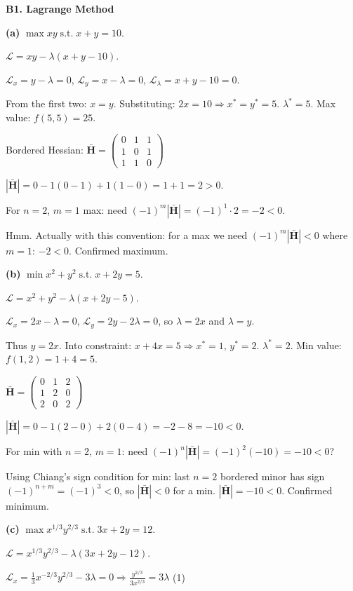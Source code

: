 \documentclass[12pt, a4paper]{article}
\theoremstyle{definition}
\newcommand{\bH}{\mathbf{H}}
\newcommand{\st}{\;\text{s.t.}\;}
\begin{document}
\begin{solbox}
\textbf{B1. Lagrange Method}

\textbf{(a)} $\max xy \st x+y=10$.

$\mathcal{L} = xy - \lambda(x+y-10)$.

$\mathcal{L}_x = y-\lambda=0$, $\mathcal{L}_y = x-\lambda=0$, $\mathcal{L}_\lambda = x+y-10=0$.

From the first two: $x=y$. Substituting: $2x=10 \Rightarrow x^*=y^*=5$.
$\lambda^*=5$. Max value: $f(5,5)=25$.

Bordered Hessian:
$\bar{\bH}=\begin{pmatrix}0&1&1\\1&0&1\\1&1&0\end{pmatrix}$

$|\bar{\bH}| = 0-1(0-1)+1(1-0)=1+1=2>0$.

For $n=2$, $m=1$ max: need $(-1)^m|\bar{\bH}|=(-1)^1\cdot 2=-2<0$.

Hmm. Actually with this convention: for a max we need $(-1)^m|\bar{\bH}|<0$
where $m=1$: $-2<0$. \checkmark Confirmed maximum.

\medskip
\textbf{(b)} $\min x^2+y^2 \st x+2y=5$.

$\mathcal{L}=x^2+y^2-\lambda(x+2y-5)$.

$\mathcal{L}_x=2x-\lambda=0$, $\mathcal{L}_y=2y-2\lambda=0$, so $\lambda=2x$ and $\lambda=y$.

Thus $y=2x$. Into constraint: $x+4x=5 \Rightarrow x^*=1$, $y^*=2$.
$\lambda^*=2$. Min value: $f(1,2)=1+4=5$.

$\bar{\bH}=\begin{pmatrix}0&1&2\\1&2&0\\2&0&2\end{pmatrix}$

$|\bar{\bH}|=0-1(2-0)+2(0-4)=-2-8=-10<0$.

For min with $n=2$, $m=1$: need $(-1)^n|\bar{\bH}|=(-1)^2(-10)=-10<0$?

Using Chiang's sign condition for min: last $n=2$ bordered minor has sign $(-1)^{n+m}=(-1)^3<0$, so $|\bar{\bH}|<0$ for a min. $|\bar{\bH}|=-10<0$. \checkmark Confirmed minimum.

\medskip
\textbf{(c)} $\max x^{1/3}y^{2/3} \st 3x+2y=12$.

$\mathcal{L}=x^{1/3}y^{2/3}-\lambda(3x+2y-12)$.

$\mathcal{L}_x=\frac{1}{3}x^{-2/3}y^{2/3}-3\lambda=0 \Rightarrow \frac{y^{2/3}}{3x^{2/3}}=3\lambda$ \quad (1)


\end{solbox}
\end{document}
